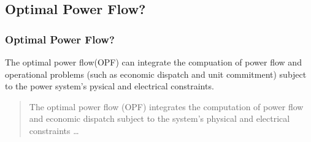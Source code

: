 \documentclass[
	11pt, %
	aspectratio=169, %
]{beamer}
\begin{document}

\subsection{Optimal Power Flow?}

\begin{frame}
	\frametitle{Optimal Power Flow?}
	
	The \alert{optimal power flow(OPF)} can integrate the compuation of power flow and operational problems (such as economic dispatch and unit commitment) subject to the power system's pysical and electrical constraints.

	\bigskip %
	
	\begin{quote}
		The optimal power flow (OPF) integrates the computation of power flow and economic dispatch subject to the system's physical and electrical constraints \ldots \parencite{Ali_2024}
	\end{quote}
	
	\bigskip %
	
	
\end{frame}


\end{document}
